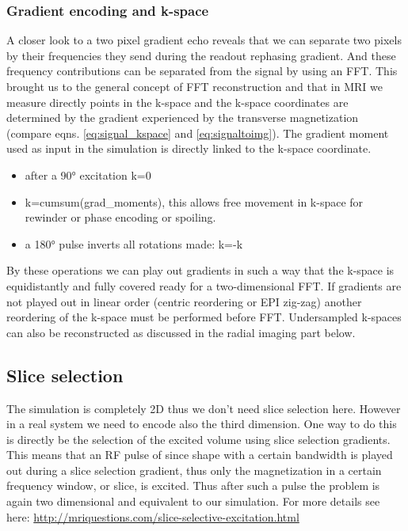 \documentclass[a4paper,12pt]{extarticle}
\begin{document}
\subsubsection{Gradient encoding and k-space}
A closer look to a two pixel gradient echo reveals that we can separate two pixels by their frequencies they send during the readout rephasing gradient. And these frequency contributions can be separated from the signal by using an FFT.
This brought us to the general concept of FFT reconstruction and that in MRI we measure directly points in the k-space and the k-space coordinates are determined by the gradient experienced by the transverse magnetization (compare eqns. \eqref{eq:signal_kspace} and \eqref{eq:signaltoimg}). The gradient moment used as input in the simulation is directly linked to the k-space coordinate.
\begin{itemize}
\item after a 90° excitation k=0
\item k=cumsum(grad\_moments), this allows free movement in k-space for rewinder or phase encoding or spoiling.
\item a 180° pulse inverts all rotations made: k=-k
\end{itemize}
By these operations we can play out gradients in such a way that the k-space is equidistantly and fully covered ready for a two-dimensional FFT. If gradients are not played out in linear order (centric reordering or EPI zig-zag) another reordering of the k-space must be performed before FFT. Undersampled k-spaces can also be reconstructed as discussed in the radial imaging part below.

\subsection{Slice selection}
The simulation is completely 2D thus we don't need slice selection here. However in a real system we need to encode also the third dimension. One way to do this is directly be the selection of the excited volume using slice selection gradients. This means that an RF pulse of since shape with a certain bandwidth is played out during a slice selection gradient, thus only the magnetization in a certain frequency window, or slice, is excited. Thus after such a pulse the problem is again two dimensional and equivalent to our simulation. For more details see here: \href{http://mriquestions.com/slice-selective-excitation.html}{http://mriquestions.com/slice-selective-excitation.html}
\end{document}
